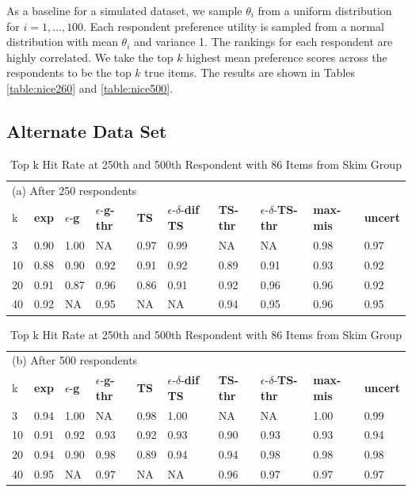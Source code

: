 \documentclass[nonblindrev]{informs3}
\newcommand{\fixedexpressS}{\textbf{exp}}
\newcommand{\egreedyS}{$\epsilon$-\textbf{g}}
\newcommand{\egreedythresS}{$\epsilon$-\textbf{g-thr}}
\newcommand{\misminS}{\textbf{max-mis}}
\newcommand{\tsS}{\textbf{TS} }
\newcommand{\edtsS}{$\epsilon$-$\delta$-\textbf{dif TS} }
\newcommand{\tsthresS}{\textbf{TS-thr} }
\newcommand{\edtsthresS}{$\epsilon$-$\delta$-\textbf{TS-thr} }
\newcommand{\uncertS}{\textbf{uncert} }
\begin{document}
As a baseline for a simulated dataset, we sample $\theta_i$ from a uniform distribution for $i=1,\ldots,100$. Each respondent preference utility is sampled from a normal distribution with mean $\theta_i$ and variance 1. The rankings for each respondent are highly correlated. We take the top $k$ highest mean preference scores across the respondents to be the top $k$ true items. The results are shown in Tables \ref{table:nice260} and \ref{table:nice500}.

\subsection{Alternate Data Set}

\begin{table}
\caption{Top k Hit Rate at 250th and 500th Respondent with 86 Items from Skim Group}
\label{table:skim}
\begin{center}
\begin{tabular}{llllllllll}
\hline 
\hline
\multicolumn{10}{l}{(a) After 250 respondents}\\
k &  \fixedexpressS&\egreedyS&\egreedythresS&\tsS&\edtsS&\tsthresS&\edtsthresS& \misminS& \uncertS \\ \hline
  3 & 0.90 &   1.00 &  NA &   0.97 & 0.99 & NA & NA &    0.98 &   0.97 \\
  10 &  0.88 &   0.90 & 0.92 &   0.91 & 0.92 & 0.89 & 0.91 &    0.93 &   0.92 \\
  20 & 0.91 & 0.87 &  0.96 & 0.86 & 0.91 & 0.92 & 0.96 &  0.96 &   0.92 \\  
  40 &  0.92 &   NA &  0.95 &  NA & NA & 0.94 & 0.95 &  0.96 &   0.95 \\
\hline
\hline
\end{tabular}
\begin{tabular}{llllllllll}
\multicolumn{10}{l}{(b) After 500 respondents}\\
k &  \fixedexpressS&\egreedyS&\egreedythresS&\tsS&\edtsS&\tsthresS&\edtsthresS& \misminS& \uncertS  \\
\hline
   3 & 0.94 & 1.00 & NA & 0.98 & 1.00 & NA & NA & 1.00 &   0.99 \\
  10 &  0.91 &   0.92 &  0.93 &   0.92 & 0.93 & 0.90 & 0.93 &    0.93 &   0.94 \\  
  20 &  0.94 &   0.90 & 0.98 &  0.89 & 0.94 & 0.94 & 0.98 &  0.98 &   0.98 \\ 
  40 &  0.95 &   NA & 0.97 & NA & NA & 0.96 &  0.97 & 0.97 & 0.97 \\
\hline 
\hline
\end{tabular}
\end{center}
\end{table}
\end{document}
